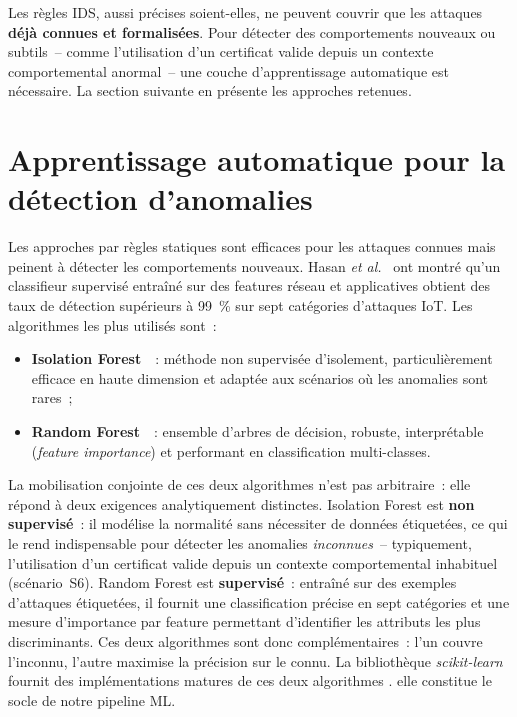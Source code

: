 Les règles IDS, aussi précises soient-elles, ne peuvent couvrir que les attaques \textbf{déjà connues et formalisées}. Pour détecter des comportements nouveaux ou subtils~-- comme l'utilisation d'un certificat valide depuis un contexte comportemental anormal~-- une couche d'apprentissage automatique est nécessaire. La section suivante en présente les approches retenues.

\section{Apprentissage automatique pour la détection d'anomalies}
\label{sec:ea-ml}

Les approches par règles statiques sont efficaces pour les attaques connues mais peinent à détecter les comportements nouveaux. Hasan \emph{et al.}~\cite{hasan2020securing} ont montré qu'un classifieur supervisé entraîné sur des features réseau et applicatives obtient des taux de détection supérieurs à 99~\% sur sept catégories d'attaques IoT. Les algorithmes les plus utilisés sont~:

\begin{itemize}[leftmargin=*]
  \item \textbf{Isolation Forest}~\cite{liu2008isolation}~: méthode non supervisée d'isolement, particulièrement efficace en haute dimension et adaptée aux scénarios où les anomalies sont rares~;
  \item \textbf{Random Forest}~\cite{breiman2001random}~: ensemble d'arbres de décision, robuste, interprétable (\emph{feature importance}) et performant en classification multi-classes.
\end{itemize}

La mobilisation conjointe de ces deux algorithmes n'est pas arbitraire~: elle répond à deux exigences analytiquement distinctes. Isolation Forest est \textbf{non supervisé}~: il modélise la normalité sans nécessiter de données étiquetées, ce qui le rend indispensable pour détecter les anomalies \emph{inconnues}~-- typiquement, l'utilisation d'un certificat valide depuis un contexte comportemental inhabituel (scénario~S6). Random Forest est \textbf{supervisé}~: entraîné sur des exemples d'attaques étiquetées, il fournit une classification précise en sept catégories et une mesure d'importance par feature permettant d'identifier les attributs les plus discriminants. Ces deux algorithmes sont donc complémentaires~: l'un couvre l'inconnu, l'autre maximise la précision sur le connu. La bibliothèque \emph{scikit-learn}~\cite{scikit_learn} fournit des implémentations matures de ces deux algorithmes . elle constitue le socle de notre pipeline ML.

